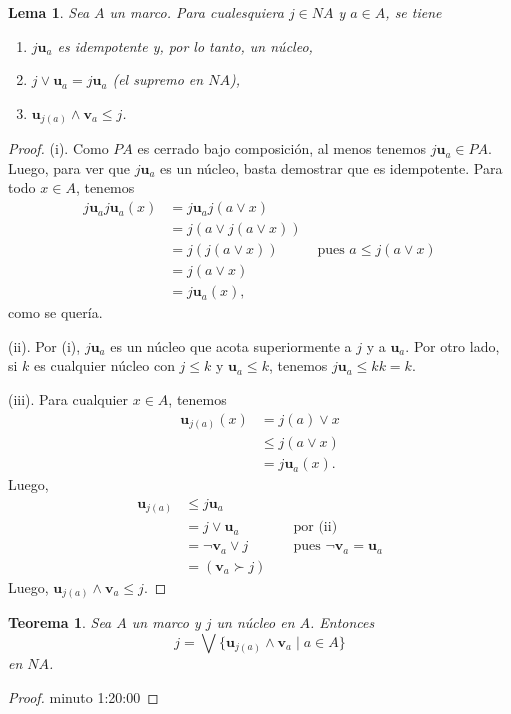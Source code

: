\documentclass[12pt,letterpaper,titlepage]{article}
\newtheorem*{lemma}{Lema}
\newtheorem*{thm}{Teorema}
\theoremstyle{definition}
\renewcommand\sup{\vee}
\newcommand\Sup{\bigvee}
\renewcommand\inf{\wedge}
\newcommand\unuc[1]{\mathbf u_{#1}}
\newcommand\vnuc[1]{\mathbf v_{#1}}
\newcommand\<{\langle}
\renewcommand\>{\rangle}
\begin{document}
\begin{lemma}
  Sea $A$ un marco.
  Para cualesquiera $j\in NA$ y $a\in A$, se tiene
  \begin{enumerate}[label=(\roman*)]
    \item $j\unuc a$ es idempotente y, por lo tanto, un núcleo,
    \item $j\sup\unuc a = j\unuc a$ (el supremo en $NA$),
    \item $\unuc{j(a)}\inf\vnuc a\leq j$.
  \end{enumerate}
\end{lemma}
\begin{proof}
  (i). Como $PA$ es cerrado bajo composición, al menos tenemos
  $j\unuc a\in PA$.
  Luego, para ver que $j\unuc a$ es un núcleo,
  basta demostrar que es idempotente.
  Para todo $x\in A$, tenemos
  \begin{align*}
    j\unuc a j\unuc a (x)
    &= j\unuc a j(a\sup x) \\
    &= j(a\sup j(a\sup x)) \\
    &= j(j(a\sup x))
      & \text{ pues } a\leq j(a\sup x) \\
    &= j(a\sup x) \\
    &= j\unuc a (x),
  \end{align*}
  como se quería.

  (ii). Por (i), $j\unuc a$ es un núcleo que acota
  superiormente a $j$ y a $\unuc a$.
  Por otro lado, si $k$ es cualquier núcleo con $j\leq k$ y
  $\unuc a\leq k$, tenemos $j\unuc a \leq kk=k$.

  (iii). Para cualquier $x\in A$, tenemos
  \begin{align*}
    \unuc{j(a)}(x)
    &= j(a)\sup x \\
    &\leq j(a \sup x) \\
    &= j\unuc a(x).
  \end{align*}
  Luego,
  \begin{align*}
    \unuc{j(a)}
    &\leq j\unuc a \\
    &= j\sup \unuc a && \text{ por (ii)} \\
    &= \neg \vnuc a \sup j
      && \text{ pues } \neg\vnuc a = \unuc a \\
    &= (\vnuc a \succ j)
  \end{align*}
  Luego, $\unuc{j(a)} \inf \vnuc a \leq j$.
\end{proof}

\begin{thm}
  Sea $A$ un marco y $j$ un núcleo en $A$.
  Entonces
  \[
    j = \Sup\{ \unuc{j(a)}\inf\vnuc a \mid a\in A\}
  \]
  en $NA$.
\end{thm}
\begin{proof}
  minuto 1:20:00
\end{proof}
\end{document}
